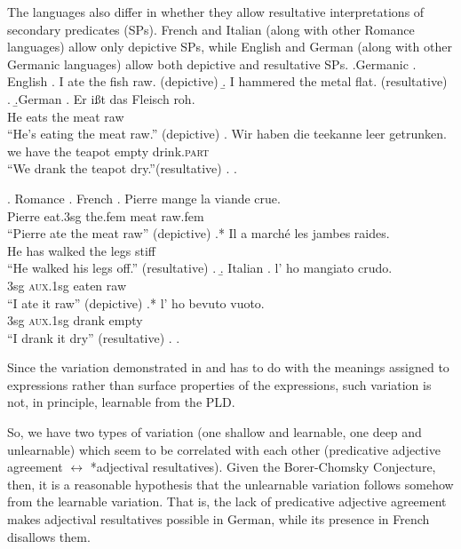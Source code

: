 \documentclass[letterpaper,12pt]{article}
\begin{document}
The languages also differ in whether they allow resultative interpretations of secondary predicates (SPs).
French and Italian (along with other Romance languages) allow only depictive SPs, while English and German (along with other Germanic languages) allow both depictive and resultative SPs.
\ex.Germanic
\a. English
\a. I ate the fish raw. (depictive)
\b. I hammered the metal flat. (resultative)
\z.
\b.German 
\ag. Er i\ss{}t das Fleisch roh. \parencite{muller2004analysis}\\
He eats the meat raw { }\\
``He's eating the meat raw.'' (depictive)
\bg. Wir haben die teekanne leer getrunken. \parencite{kratzer_building_2004}\\
we have the teapot empty drink.\textsc{part} { }\\
``We drank the teapot dry.''(resultative)
\z.
\z.

\ex. Romance
\a. French
\ag. Pierre mange la viande crue. \parencite{legendre1997secondary}\\
Pierre eat.3sg the.fem meat raw.fem { }\\
``Pierre ate the meat raw'' (depictive)
\bg.* Il a march\'e les jambes raides. \parencite{washio1997resultatives}\\
He has walked the legs stiff { }\\
``He walked his legs off.'' (resultative)
\z.
\b. Italian
\ag. l' ho mangiato crudo.\\
3sg \textsc{aux}.1sg eaten raw\\
``I ate it raw'' (depictive)
\bg.* l' ho bevuto vuoto.\\
3sg \textsc{aux}.1sg drank empty\\
``I drank it dry'' (resultative)
\z.
\z.

Since the variation demonstrated in \LLast and \Last has to do with the meanings assigned to expressions rather than surface properties of the expressions, such variation is not, in principle, learnable from the PLD.

So, we have two types of variation (one shallow and learnable, one deep and unlearnable) which seem to be correlated with each other (predicative adjective agreement $\leftrightarrow$ *adjectival resultatives).
Given the Borer-Chomsky Conjecture, then, it is a reasonable hypothesis that the unlearnable variation follows somehow from the learnable variation.
That is, the lack of predicative adjective agreement makes adjectival resultatives possible in German, while its presence in French disallows them.
\end{document}
